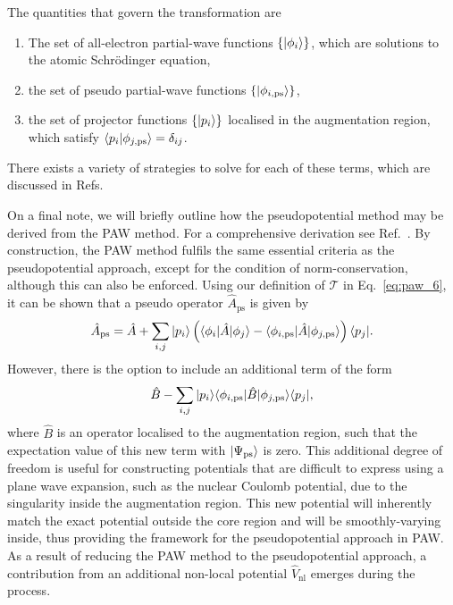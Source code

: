 The quantities that govern the 
transformation are 
%
\begin{enumerate}
\item
The set of all-electron partial-wave functions $\{\vert\phi_i\rangle\}$, 
which are solutions to the atomic Schr{\" o}dinger equation, 
%
\item
the set of pseudo partial-wave functions $\{\vert\phi_{i,\textrm{ps}}\rangle\}$, 
%
\item
the set of projector functions $\{\vert p_i\rangle\}$ 
localised in the augmentation region, 
which satisfy $\langle p_i\vert\phi_{j,\textrm{ps}}\rangle=\delta_{ij}$.
\end{enumerate}
%
There exists a variety of strategies to 
solve for each of these terms, 
which are discussed in Refs.~\cite{PhysRevB.50.17953,PhysRevB.71.035109}

On a final note, we will briefly outline  
how the pseudopotential method 
may be derived from the PAW method.
%
For a comprehensive derivation 
see Ref.~\cite{PhysRevB.59.1758}.
%
By construction, 
the PAW method fulfils the 
same essential criteria as the 
pseudopotential approach, 
except for the condition of norm-conservation, 
although this can also be enforced.
%
Using our definition of $\mathcal{T}$ in Eq.~\eqref{eq:paw_6}, 
it can be shown that 
a pseudo operator $\hat{A}_\textrm{ps}$ 
is given by
%
\begin{align}
\hat{A}_\textrm{ps}=\hat{A} 
+ \sum_{i,j} \vert p_i\rangle\left(\langle\phi_i\vert\hat{A}\vert\phi_j\rangle 
- \langle\phi_{i,\textrm{ps}}\vert\hat{A}\vert\phi_{j,\textrm{ps}}\rangle\right)\langle p_j\vert.
\end{align}
%
However, there is the option to include 
an additional term of the form 
%
\begin{equation}
\hat{B}-\sum_{i,j} \vert p_i\rangle\langle\phi_{i,\textrm{ps}}\vert\hat{B}\vert\phi_{j,\textrm{ps}}\rangle\langle p_j\vert,
\end{equation}
%
where $\hat{B}$ is an operator 
localised to the augmentation region,  
such that the expectation value 
of this new term with 
$\vert\Psi_\textrm{ps}\rangle$ is zero.
%
This additional degree of freedom 
is useful for constructing 
potentials that are difficult to 
express using a plane wave expansion, 
such as the nuclear Coulomb potential, 
due to the singularity inside 
the augmentation region.
%
This new potential will inherently match  
the exact potential outside the core region 
and will be smoothly-varying inside, 
thus providing the framework 
for the pseudopotential approach in PAW.
%
As a result of reducing the PAW method 
to the pseudopotential approach, 
a contribution from an additional 
non-local potential $\hat{V}_\textrm{nl}$ 
emerges during the process.
%


